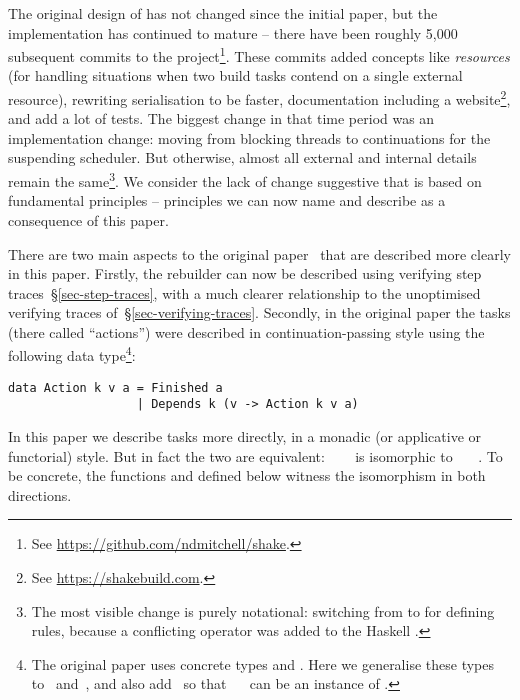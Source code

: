 The original design of \Shake has not changed since the initial paper, but the
implementation has continued to mature -- there have been roughly 5,000
subsequent commits to the \Shake
project\footnote{See \url{https://github.com/ndmitchell/shake}.}. These commits
added concepts like \emph{resources} (for handling situations when two build tasks
contend on a single external resource), rewriting serialisation to be faster,
documentation including a website\footnote{See \url{https://shakebuild.com}.},
and add a lot of tests. The biggest change in that time period was an
implementation change: moving from
blocking threads to continuations for the suspending scheduler.
But otherwise, almost all external and internal details remain the
  same\footnote{The most visible change is purely notational: switching from
  \hs{*>} to  for defining rules, because a conflicting \hs{*>}
  operator was added to the Haskell .}.
We consider the lack of change suggestive that \Shake is based on fundamental
principles -- principles we can now name and describe as a consequence
of this paper.

There are two main
aspects to the original \Shake paper~\cite{mitchell2012shake} that are described
more clearly in this paper. Firstly, the rebuilder can now be described using
verifying step traces~\S\ref{sec-step-traces}, with a much clearer relationship
to the unoptimised verifying traces of~\S\ref{sec-verifying-traces}. Secondly,
in the original paper the tasks (there called ``actions'')
were described in continuation-passing style using the following data
type\footnote{The original paper uses concrete types  and .
Here we generalise these types to~ and~, and also add~ so that
~~ can be an instance of .}:
\vspace{0.5mm}
\begin{verbatim}
data Action k v a = Finished a
                  | Depends k (v -> Action k v a)
\end{verbatim}
\vspace{0.5mm}

\noindent
In this paper we describe tasks more directly, in a monadic (or applicative or functorial)
style. But in fact the two are equivalent: ~~~ is
isomorphic to ~~~.
To be concrete, the functions  and  defined below
witness the isomorphism in both directions.

